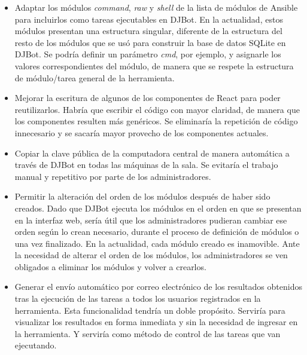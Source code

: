 \documentclass[a4paper,12pt]{article}
\begin{document}
\begin{itemize}
\item Adaptar los módulos \emph{command}, \emph{raw}  y \emph{shell} de la lista de módulos de Ansible para incluirlos como tareas ejecutables en DJBot. En la actualidad, estos módulos presentan una estructura singular, diferente de la estructura del resto de los módulos que se usó para construir la base de datos SQLite en DJBot. Se podría definir un parámetro \emph{cmd}, por ejemplo, y asignarle los valores correspondientes del módulo, de manera que se respete la estructura de módulo/tarea general de la herramienta.\\

\item Mejorar la escritura de algunos de los componentes de React para poder reutilizarlos. Habría que escribir el código con mayor claridad, de manera que los componentes resulten más genéricos. Se eliminaría la repetición de código innecesario y se sacaría mayor provecho de los componentes actuales.\\

\item Copiar la clave pública de la computadora central de manera automática a través de DJBot en todas las máquinas de la sala. Se evitaría el trabajo manual y repetitivo por parte de los administradores.\\

\item Permitir la alteración del orden de los módulos después de haber sido creados. Dado que DJBot ejecuta los módulos en el orden en que se presentan en la interfaz web, sería útil que los administradores pudieran cambiar ese orden según lo crean necesario, durante el proceso de definición de módulos o una vez finalizado. En la actualidad, cada módulo creado es inamovible. Ante la necesidad de alterar el orden de los módulos, los administradores se ven obligados a eliminar los módulos y volver a crearlos.\\

\item Generar el envío automático por correo electrónico de los resultados obtenidos tras la ejecución de las tareas a todos los usuarios registrados en la herramienta. Esta funcionalidad tendría un doble propósito. Serviría para visualizar los resultados en forma inmediata y sin la necesidad de ingresar en la herramienta. Y serviría como método de control de las tareas que van ejecutando.\\


\end{itemize}
\end{document}
